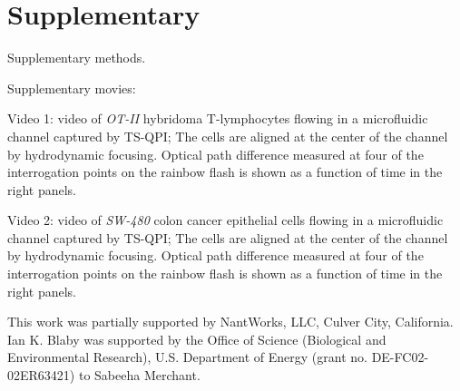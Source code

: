 \documentclass[aps,pra,reprint,longbibliography,superscriptaddress]{revtex4-1}
\begin{document}






\section*{Supplementary}
Supplementary methods.

Supplementary movies:

Video 1: video of \textit{OT-II} hybridoma T-lymphocytes flowing in a microfluidic channel captured by TS-QPI; The cells are aligned at the center of the channel by hydrodynamic focusing. Optical path difference measured at four of the interrogation points on the rainbow flash is shown as a function of time in the right panels.

Video 2: video of \textit{SW-480} colon cancer epithelial cells flowing in a microfluidic channel captured by TS-QPI; The cells are aligned at the center of the channel by hydrodynamic focusing. Optical path difference measured at four of the interrogation points on the rainbow flash is shown as a function of time in the right panels.

\begin{acknowledgments}
This work was partially supported by NantWorks, LLC, Culver City, California. Ian K. Blaby was supported by the Office of Science (Biological and Environmental Research), U.S. Department of Energy (grant no. DE-FC02-02ER63421) to Sabeeha Merchant.
\end{acknowledgments}
\end{document}

